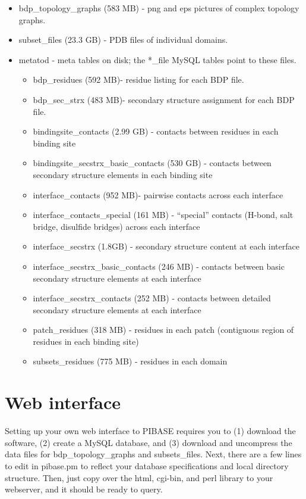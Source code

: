 \documentclass[11pt]{article}
\begin{document}
\begin{itemize}
   \item bdp\_topology\_graphs (583 MB) - png and eps pictures of complex topology graphs.
   \item subset\_files (23.3 GB) - PDB files of individual domains.
   \item metatod - meta tables on disk; the *\_file MySQL tables point to these files.
   \begin{itemize}
      \item bdp\_residues (592 MB)- residue listing for each BDP file.
      \item bdp\_sec\_strx (483 MB)- secondary structure assignment for each BDP file.
      \item bindingsite\_contacts (2.99 GB) - contacts between residues in each binding site
      \item bindingsite\_secstrx\_basic\_contacts (530 GB) - contacts between secondary structure elements in each binding site
      \item interface\_contacts (952 MB)- pairwise contacts across each interface
      \item interface\_contacts\_special (161 MB) - ``special'' contacts (H-bond, salt bridge, disulfide bridges) across each interface
      \item interface\_secstrx (1.8GB) - secondary structure content at each interface
      \item interface\_secstrx\_basic\_contacts (246 MB) - contacts between basic secondary structure elements at each interface
      \item interface\_secstrx\_contacts (252 MB) - contacts between detailed secondary structure elements at each interface
      \item patch\_residues (318 MB) - residues in each patch (contiguous region of residues in each binding site)
      \item subsets\_residues (775 MB) - residues in each domain
   \end{itemize}
\end{itemize}


\section{Web interface}

Setting up your own web interface to PIBASE requires you to (1) download the software, (2) create a MySQL database, and (3) download and uncompress the data files for bdp\_topology\_graphs and subsets\_files. Next, there are a few lines to edit in pibase.pm to reflect your database specifications and local directory structure. Then, just copy over the html, cgi-bin, and perl library to your webserver, and it should be ready to query.
\end{document}
